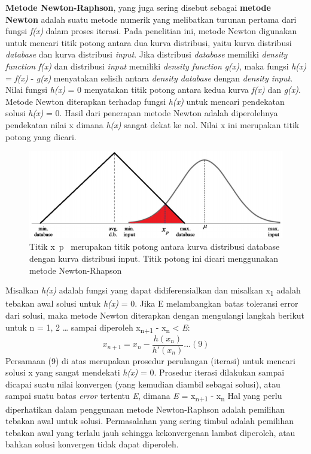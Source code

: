 \documentclass[
]{book}
\begin{document}
\textbf{Metode Newton-Raphson}, yang juga sering disebut sebagai \textbf{metode Newton} adalah suatu metode numerik yang melibatkan turunan pertama dari fungsi \emph{f(x)} dalam proses iterasi. Pada penelitian ini, metode Newton digunakan untuk mencari titik potong antara dua kurva distribusi, yaitu kurva distribusi \emph{database} dan kurva distribusi \emph{input}. Jika distribusi \emph{database} memiliki \emph{density function} \emph{f(x)} dan distribusi \emph{input} memiliki \emph{density function} \emph{g(x)}, maka fungsi \emph{h(x)} = \emph{f(x)} - \emph{g(x)} menyatakan selisih antara \emph{density database} dengan \emph{density input}. Nilai fungsi \emph{h(x)} = 0 menyatakan titik potong antara kedua kurva \emph{f(x)} dan \emph{g(x)}. Metode Newton diterapkan terhadap fungsi \emph{h(x)} untuk mencari pendekatan solusi \emph{h(x)} = 0. Hasil dari penerapan metode Newton adalah diperolehnya pendekatan nilai x dimana \emph{h(x)} sangat dekat ke nol. Nilai x ini merupakan titik potong yang dicari.

\begin{figure}

{\centering \includegraphics[width=0.5\linewidth]{images/screening/newton_rhapson} 

}

\caption{Titik x~p~ merupakan titik potong antara kurva distribusi database dengan kurva distribusi input. Titik potong ini dicari menggunakan metode Newton-Rhapson}\label{fig:unnamed-chunk-10}
\end{figure}

Misalkan \emph{h(x)} adalah fungsi yang dapat didiferensialkan dan misalkan x\textsubscript{1} adalah tebakan awal solusi untuk \emph{h(x)} = 0. Jika E melambangkan batas toleransi error dari solusi, maka metode Newton diterapkan dengan mengulangi langkah berikut untuk n = 1, 2 \ldots{} sampai diperoleh \textbar x\textsubscript{n+1} - x\textsubscript{n}\textbar{} \textless{} \emph{E}:
\[x_{n+1} = x_n - \frac{h(x_n)}{h'(x_n)}...(9)\]
Persamaan (9) di atas merupakan prosedur perulangan (iterasi) untuk mencari solusi x yang sangat mendekati \emph{h(x)} = 0. Prosedur iterasi dilakukan sampai dicapai suatu nilai konvergen (yang kemudian diambil sebagai solusi), atau sampai suatu batas \emph{error} tertentu \emph{E}, dimana \emph{E} = \textbar x\textsubscript{n+1} - x\textsubscript{n}\textbar{} Hal yang perlu diperhatikan dalam penggunaan metode Newton-Raphson adalah pemilihan tebakan awal untuk solusi. Permasalahan yang sering timbul adalah pemilihan tebakan awal yang terlalu jauh sehingga kekonvergenan lambat diperoleh, atau bahkan solusi konvergen tidak dapat diperoleh.
\end{document}
